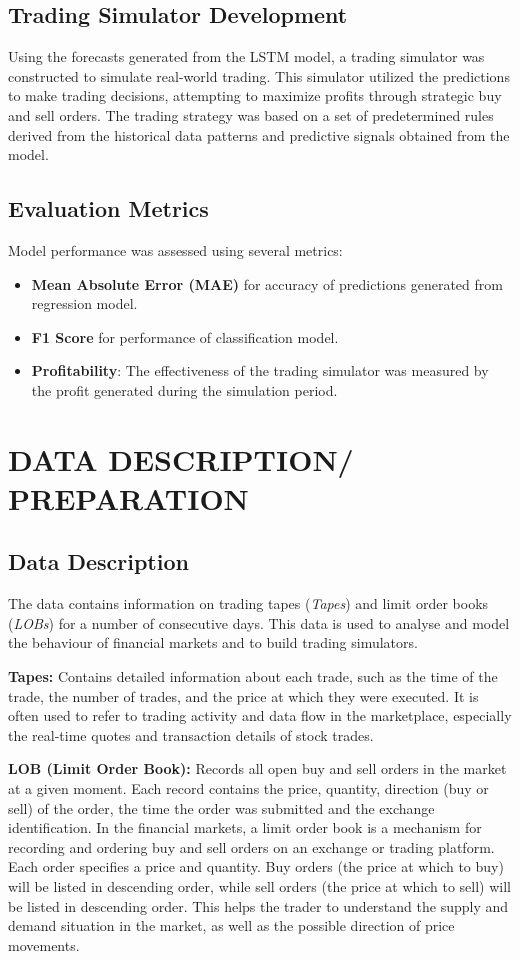 \documentclass[conference]{IEEEtran}
\begin{document}
\subsection{Trading Simulator Development}
Using the forecasts generated from the LSTM model, a trading simulator was constructed to simulate real-world trading. This simulator utilized the predictions to make trading decisions, attempting to maximize profits through strategic buy and sell orders. The trading strategy was based on a set of predetermined rules derived from the historical data patterns and predictive signals obtained from the model.

\subsection{Evaluation Metrics}
Model performance was assessed using several metrics:
\begin{itemize}
    \item \textbf{Mean Absolute Error (MAE)} for accuracy of predictions generated from regression model.
    \item \textbf{F1 Score} for performance of classification model.
    \item \textbf{Profitability}: The effectiveness of the trading simulator was measured by the profit generated during the simulation period.
\end{itemize}

\section{DATA DESCRIPTION/ PREPARATION}
\subsection{Data Description}
The data contains information on trading tapes (\emph{Tapes}) and limit order books (\emph{LOBs}) for a number of consecutive days. This data is used to analyse and model the behaviour of financial markets and to build trading simulators.

\textbf{Tapes:} Contains detailed information about each trade, such as the time of the trade, the number of trades, and the price at which they were executed. It is often used to refer to trading activity and data flow in the marketplace, especially the real-time quotes and transaction details of stock trades.

\textbf{LOB (Limit Order Book):} Records all open buy and sell orders in the market at a given moment. Each record contains the price, quantity, direction (buy or sell) of the order, the time the order was submitted and the exchange identification. In the financial markets, a limit order book is a mechanism for recording and ordering buy and sell orders on an exchange or trading platform. Each order specifies a price and quantity. Buy orders (the price at which to buy) will be listed in descending order, while sell orders (the price at which to sell) will be listed in descending order. This helps the trader to understand the supply and demand situation in the market, as well as the possible direction of price movements.
\end{document}
